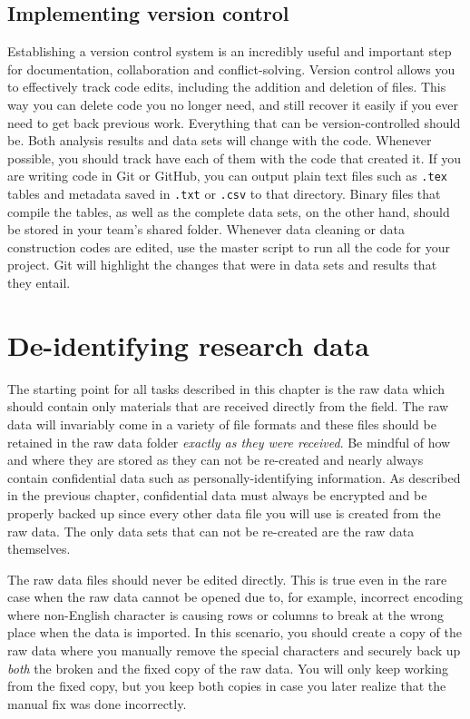 \subsection{Implementing version control}

Establishing a version control system is an incredibly useful
and important step for documentation, collaboration and conflict-solving.
Version control allows you to effectively track code edits,
including the addition and deletion of files.
This way you can delete code you no longer need,
and still recover it easily if you ever need to get back previous work.
Everything that can be version-controlled should be.
Both analysis results and data sets will change with the code.
Whenever possible, you should track have each of them with the code that created it.
If you are writing code in Git or GitHub,
you can output plain text files such as \texttt{.tex} tables
and metadata saved in \texttt{.txt} or \texttt{.csv} to that directory.
Binary files that compile the tables,
as well as the complete data sets, on the other hand,
should be stored in your team's shared folder.
Whenever data cleaning or data construction codes are edited,
use the master script to run all the code for your project.
Git will highlight the changes that were in data sets and results that they entail.


\section{De-identifying research data}

The starting point for all tasks described in this chapter is the raw data
which should contain only materials that are received directly from the field.
The raw data will invariably come in a variety of file formats and these files
should be retained in the raw data folder \textit{exactly as they were 
received}. Be mindful of how and where they are stored as they can not be
re-created and nearly always contain confidential data such as
personally-identifying information.
As described in the previous chapter, confidential data must always be
encrypted and be
properly backed up since every other data file you will use is created from the
raw data. The only data sets that can not be re-created are the raw data 
themselves.

The raw data files should never be edited directly. This is true even in the
rare case when the raw data cannot be opened due to, for example, incorrect
encoding where non-English character is causing rows or columns to break at the
wrong place when the data is imported. In this scenario, you should create a
copy of the raw data where you manually remove the special characters and
securely back up \textit{both} the broken and the fixed copy of the raw data.
You will only keep working from the fixed copy, but you keep both copies in
case you later realize that the manual fix was done incorrectly.

